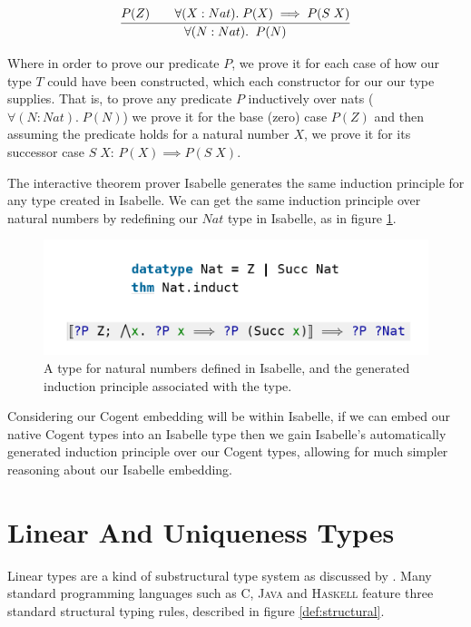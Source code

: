 \[
    \infer{
        \forall(N : Nat).\;\; P(N)
    }{
        P(Z) \quad & \forall (X : Nat).\; P(X) \implies P(S\; X)
    }
\]

Where in order to prove our predicate $P$, we prove it for each case of how our type $T$ could have been
constructed, which each constructor for our our type supplies.
That is, to prove any predicate $P$ inductively over nats ($\forall(N : Nat).\; P(N)$)
we prove it for the base (zero) case $P(Z)$ and then assuming the predicate holds
for a natural number $X$, we prove it for its successor case $S\; X$: $P(X) \implies P(S\; X)$.

The interactive theorem prover Isabelle generates the same induction principle for any type created in
Isabelle. We can get the same induction principle over natural numbers by redefining our $Nat$
type in Isabelle, as in figure \ref{fig:IsabelleNatInduct}.

\begin{center}
    \begin{figure}
        \includegraphics[width=\linewidth]{content/isabelleNatInduct.png}
        \caption{A type for natural numbers defined in Isabelle, and the generated 
        induction principle associated with the type.}
        \label{fig:IsabelleNatInduct}
    \end{figure}
\end{center}

\FloatBarrier

Considering our Cogent embedding will be within Isabelle, if we can embed our native
Cogent types into an Isabelle type then we gain Isabelle's automatically generated
induction principle over our Cogent types, allowing for much 
simpler reasoning about our Isabelle embedding.

\section{Linear And Uniqueness Types}

Linear types are a kind of substructural type system as discussed by \citet{Substructural}.
Many standard programming languages such as \textsc{C}, \textsc{Java} and \textsc{Haskell} feature
three standard structural typing rules, described in figure \autoref{def:structural}.

